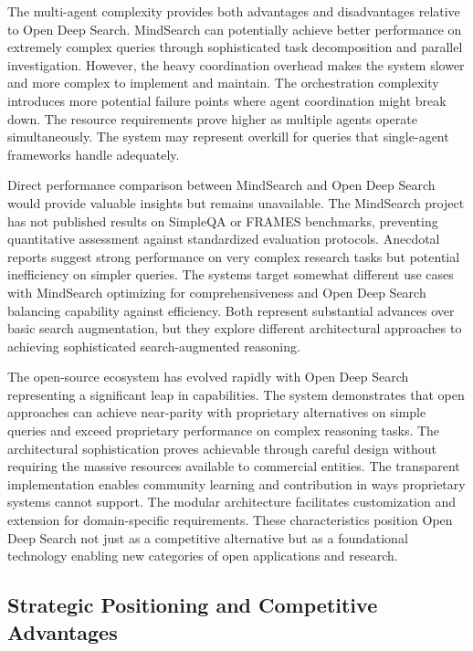 The multi-agent complexity provides both advantages and disadvantages relative to Open Deep Search. MindSearch can potentially achieve better performance on extremely complex queries through sophisticated task decomposition and parallel investigation. However, the heavy coordination overhead makes the system slower and more complex to implement and maintain. The orchestration complexity introduces more potential failure points where agent coordination might break down. The resource requirements prove higher as multiple agents operate simultaneously. The system may represent overkill for queries that single-agent frameworks handle adequately.

Direct performance comparison between MindSearch and Open Deep Search would provide valuable insights but remains unavailable. The MindSearch project has not published results on SimpleQA or FRAMES benchmarks, preventing quantitative assessment against standardized evaluation protocols. Anecdotal reports suggest strong performance on very complex research tasks but potential inefficiency on simpler queries. The systems target somewhat different use cases with MindSearch optimizing for comprehensiveness and Open Deep Search balancing capability against efficiency. Both represent substantial advances over basic search augmentation, but they explore different architectural approaches to achieving sophisticated search-augmented reasoning.

The open-source ecosystem has evolved rapidly with Open Deep Search representing a significant leap in capabilities. The system demonstrates that open approaches can achieve near-parity with proprietary alternatives on simple queries and exceed proprietary performance on complex reasoning tasks. The architectural sophistication proves achievable through careful design without requiring the massive resources available to commercial entities. The transparent implementation enables community learning and contribution in ways proprietary systems cannot support. The modular architecture facilitates customization and extension for domain-specific requirements. These characteristics position Open Deep Search not just as a competitive alternative but as a foundational technology enabling new categories of open applications and research.

\subsection{Strategic Positioning and Competitive Advantages}

